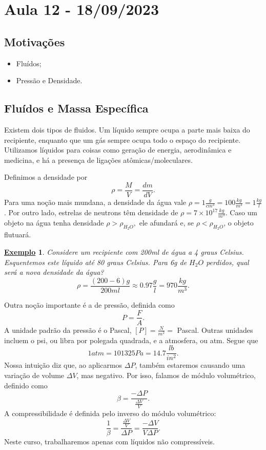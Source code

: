 \documentclass{article}
\newtheorem{example}{\underline{Exemplo}}
\begin{document}
\section{Aula 12 - 18/09/2023}
\subsection{Motivações}
\begin{itemize}
  \item Fluídos;
  \item Pressão e Densidade.
\end{itemize}
\subsection{Fluídos e Massa Específica}
  Existem dois tipos de fluidos. Um líquido sempre ocupa a parte mais baixa do recipiente, enquanto que um gás 
sempre ocupa todo o espaço do recipiente. Utilizamos líquidos para coisas como geração de energia, aerodinâmica e medicina,
e há a presença de ligações atômicas/moleculares. 
  
Definimos a densidade por 
  \[
    \rho = \frac{M}{V} = \frac{dm}{dV}.
  \]
  Para uma noção mais mundana, a densidade da água vale \(\rho = 1 \frac{g}{cm^{3}} = 100 \frac{kg}{m^{3}} = 1 \frac{kg}{l}\). Por outro lado, estrelas de neutrons 
têm densidade de \(\rho = 7\times 10^{17}\frac{kg}{m^{3}}\). Caso um objeto na água tenha densidade \(\rho > \rho_{H_{2}O},\) ele afundará e, se
 \(\rho < \rho_{H_{2}O}\), o objeto flutuará.
\begin{example}
  Considere um recipiente com 200ml de água a 4 graus Celsius. Esquentemos este líquido até 80 graus Celsius.
Para 6g de \(H_{2}O\) perdidos, qual será a nova densidade da água? 
  \[
    \rho = \frac{(200 - 6)g}{200ml}\approx 0.97 \frac{g}{l} = 970 \frac{kg}{m^{3}}.
  \]
\end{example}
  Outra noção importante é a de pressão, definida como 
    \[
      P = \frac{F}{A}.
    \]
  A unidade padrão da pressão é o Pascal, \([P]= \frac{N}{m^{2}} =\) Pascal. Outras unidades incluem o psi, 
  ou libra por polegada quadrada, e a atmosfera, ou atm. Segue que 
    \[
      1atm = 101325 Pa = 14.7 \frac{lb}{in^{2}}.
    \]
  Nossa intuição diz que, ao aplicarmos \(\Delta P\), também estaremos causando uma variação de volume \(\Delta V\), mas negativo.
Por isso, falamos de módulo volumétrico, definido como 
  \[
    \beta = \frac{-\Delta P}{\frac{\Delta V}{V}}.
  \]
  A compressibilidade é definida pelo inverso do módulo volumétrico: 
    \[
      \frac{1}{\beta } = \frac{\frac{\Delta V}{V}}{\Delta P} = \frac{-\Delta V}{V\Delta P}.
    \]
  Neste curso, trabalharemos apenas com líquidos não compressíveis.
\end{document}
